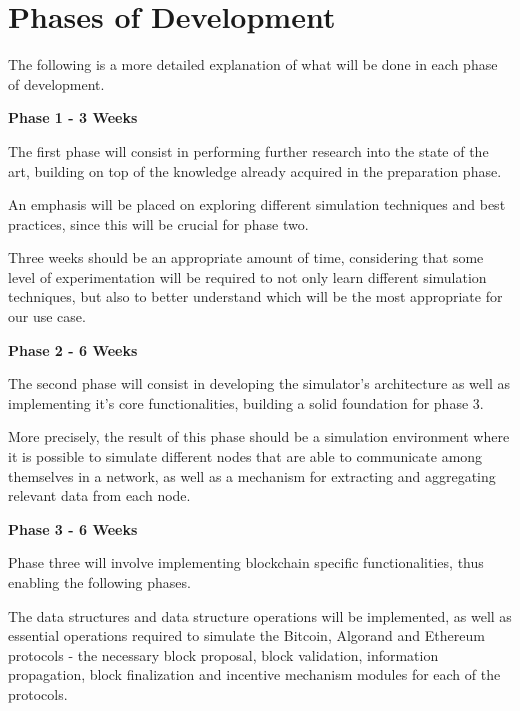 \section{Phases of Development}

The following is a more detailed explanation of what will be done in each phase of development.

\vspace{0.5cm}

\textbf{Phase 1 - 3 Weeks}

The first phase will consist in performing further research into the state of the art, building on top of the knowledge already acquired in the preparation phase.

An emphasis will be placed on exploring different simulation techniques and best practices, since this will be crucial for phase two.

Three weeks should be an appropriate amount of time, considering that some level of experimentation will be required to not only learn different simulation techniques, but also to better understand which will be the most appropriate for our use case.

\vspace{0.5cm}

\textbf{Phase 2 - 6 Weeks}

The second phase will consist in developing the simulator's architecture as well as implementing it's core functionalities, building a solid foundation for phase 3.

More precisely, the result of this phase should be a simulation environment where it is possible to simulate different nodes that are able to communicate among themselves in a network, as well as a mechanism for extracting and aggregating relevant data from each node.

\vspace{0.5cm}

\textbf{Phase 3 - 6 Weeks}

Phase three will involve implementing blockchain specific functionalities, thus enabling the following phases. 

The data structures and data structure operations will be implemented, as well as essential operations required to simulate the Bitcoin, Algorand and Ethereum protocols - the necessary block proposal, block validation, information propagation, block finalization and incentive mechanism modules for each of the protocols.

\vspace{0.5cm}

